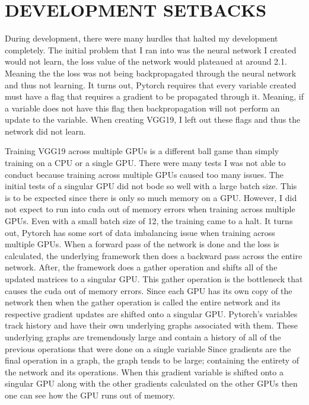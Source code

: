 \documentclass[12pt,conference]{ieeeconf}
\begin{document}
\section{DEVELOPMENT SETBACKS}
	During development, there were many hurdles that halted my development completely. The initial problem that I ran into was the neural network I created would not learn, the loss value of the network would plateaued at around 2.1. Meaning the the loss was not being backpropagated through the neural network and thus not learning. It turns out, Pytorch requires that every variable created must have a flag that requires a gradient to be propagated through it. Meaning, if a variable does not have this flag then backpropagation will not perform an update to the variable. When creating VGG19, I left out these flags and thus the network did not learn.
	
	Training VGG19 across multiple GPUs is a different ball game than simply training on a CPU or a single GPU. There were many tests I was not able to conduct because training across multiple GPUs caused too many issues. The initial tests of a singular GPU did not bode so well with a large batch size. This is to be expected since there is only so much memory on a GPU. However, I did not expect to run into cuda out of memory errors when training across multiple GPUs. Even with a small batch size of 12, the training came to a halt. It turns out, Pytorch has some sort of data imbalancing issue when training across multiple GPUs. When a forward pass of the network is done and the loss is calculated, the underlying framework then does a backward pass across the entire network. After, the framework does a gather operation and shifts all of the updated matrices to a singular GPU. This gather operation is the bottleneck that causes the cuda out of memory errors. Since each GPU has its own copy of the network then when the gather operation is called the entire network and its respective gradient updates are shifted onto a singular GPU. Pytorch's variables track history and have their own underlying graphs associated with them. These underlying graphs are tremendously large and contain a history of all of the previous operations that were done on a single variable Since gradients are the final operation in a graph, the graph tends to be large; containing the entirety of the network and its operations. When this gradient variable is shifted onto a singular GPU along with the other gradients calculated on the other GPUs then one can see how the GPU runs out of memory.
	
\end{document}
